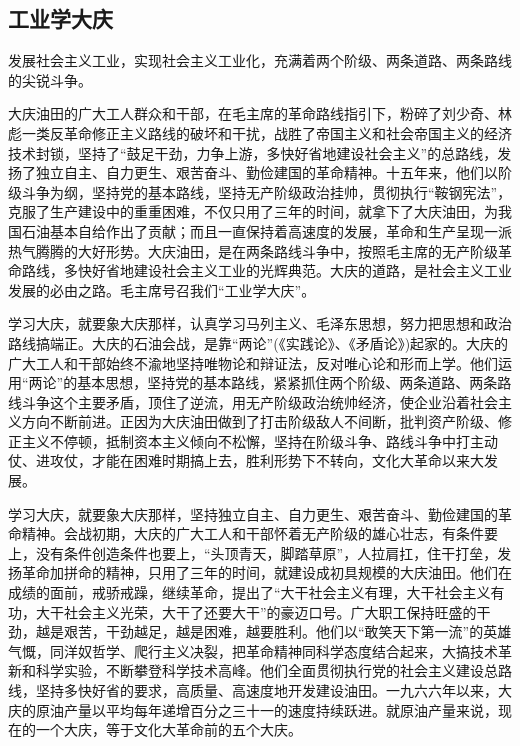 \documentclass{book}
\begin{document}
\subsection{工业学大庆}

发展社会主义工业，实现社会主义工业化，充满着两个阶级、两条道路、两条路线的尖锐斗争。

大庆油田的广大工人群众和干部，在毛主席的革命路线指引下，粉碎了刘少奇、林彪一类反革命修正主义路线的破坏和干扰，战胜了帝国主义和社会帝国主义的经济技术封锁，坚持了“鼓足干劲，力争上游，多快好省地建设社会主义”的总路线，发扬了独立自主、自力更生、艰苦奋斗、勤俭建国的革命精神。十五年来，他们以阶级斗争为纲，坚持党的基本路线，坚持无产阶级政治挂帅，贯彻执行“鞍钢宪法”，克服了生产建设中的重重困难，不仅只用了三年的时间，就拿下了大庆油田，为我国石油基本自给作出了贡献；而且一直保持着高速度的发展，革命和生产呈现一派热气腾腾的大好形势。大庆油田，是在两条路线斗争中，按照毛主席的无产阶级革命路线，多快好省地建设社会主义工业的光辉典范。大庆的道路，是社会主义工业发展的必由之路。毛主席号召我们“工业学大庆”。

学习大庆，就要象大庆那样，认真学习马列主义、毛泽东思想，努力把思想和政治路线搞端正。大庆的石油会战，是靠“两论”(《实践论》、《矛盾论》)起家的。大庆的广大工人和干部始终不渝地坚持唯物论和辩证法，反对唯心论和形而上学。他们运用“两论”的基本思想，坚持党的基本路线，紧紧抓住两个阶级、两条道路、两条路线斗争这个主要矛盾，顶住了逆流，用无产阶级政治统帅经济，使企业沿着社会主义方向不断前进。正因为大庆油田做到了打击阶级敌人不间断，批判资产阶级、修正主义不停顿，抵制资本主义倾向不松懈，坚持在阶级斗争、路线斗争中打主动仗、进攻仗，才能在困难时期搞上去，胜利形势下不转向，文化大革命以来大发展。

学习大庆，就要象大庆那样，坚持独立自主、自力更生、艰苦奋斗、勤俭建国的革命精神。会战初期，大庆的广大工人和干部怀着无产阶级的雄心壮志，有条件要上，没有条件创造条件也要上，“头顶青天，脚踏草原”，人拉肩扛，住干打垒，发扬革命加拼命的精神，只用了三年的时间，就建设成初具规模的大庆油田。他们在成绩的面前，戒骄戒躁，继续革命，提出了“大干社会主义有理，大干社会主义有功，大干社会主义光荣，大干了还要大干”的豪迈口号。广大职工保持旺盛的干劲，越是艰苦，干劲越足，越是困难，越要胜利。他们以“敢笑天下第一流”的英雄气慨，同洋奴哲学、爬行主义决裂，把革命精神同科学态度结合起来，大搞技术革新和科学实验，不断攀登科学技术高峰。他们全面贯彻执行党的社会主义建设总路线，坚持多快好省的要求，高质量、高速度地开发建设油田。一九六六年以来，大庆的原油产量以平均每年递增百分之三十一的速度持续跃进。就原油产量来说，现在的一个大庆，等于文化大革命前的五个大庆。
\end{document}
